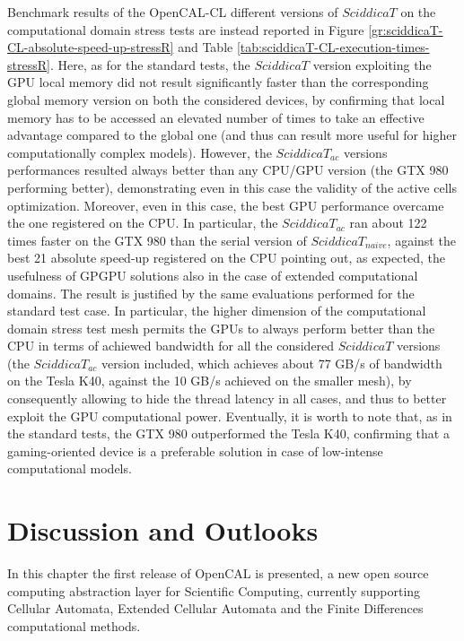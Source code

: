 Benchmark results of the OpenCAL-CL different versions of
$SciddicaT$ on the computational domain stress tests are instead
reported in Figure
\ref{gr:sciddicaT-CL-absolute-speed-up-stressR} and Table \ref{tab:sciddicaT-CL-execution-times-stressR}. Here, as for the
standard tests, the $SciddicaT$ version exploiting the GPU local
memory did not result significantly faster than the corresponding
global memory version on both the considered devices, by
confirming that local memory has to be accessed an elevated number
of times to take an effective advantage compared to the global one
(and thus can result more useful for higher computationally
complex models). However, the $SciddicaT_{ac}$ versions
performances resulted always better than any CPU/GPU version (the
GTX 980 performing better), demonstrating even in this case the
validity of the active cells optimization. Moreover, even in this
case, the best GPU performance overcame the one registered on the
CPU. In particular, the $SciddicaT_{ac}$ ran about 122 times
faster on the GTX 980 than the serial version of
$SciddicaT_{naive}$, against the best 21 absolute speed-up
registered on the CPU pointing out, as expected, the usefulness of
GPGPU solutions also in the case of extended computational domains. The
result is justified by the same evaluations performed for the
standard test case. In particular, the higher dimension of the
computational domain stress test mesh permits the GPUs to always
perform better than the CPU in terms of achiewed bandwidth for all
the considered $SciddicaT$ versions (the $SciddicaT_{ac}$ version
included, which achieves about 77 GB/s of bandwidth on the Tesla
K40, against the 10 GB/s achieved on the smaller mesh), by
consequently allowing to hide the thread latency in all cases, and
thus to better exploit the GPU computational power. Eventually, it
is worth to note that, as in the standard tests, the GTX 980
outperformed the Tesla K40, confirming that a gaming-oriented
device is a preferable solution in case of low-intense
computational models.


\section{Discussion and Outlooks}

In this chapter the first release of OpenCAL is presented, a new
open source computing abstraction layer for Scientific Computing,
currently supporting Cellular Automata, Extended Cellular Automata
and the Finite Differences computational methods.

